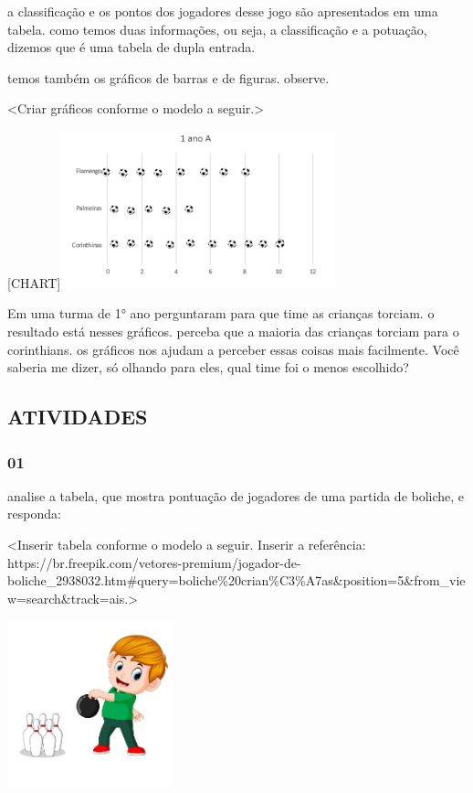 a classificação e os pontos dos jogadores desse jogo são apresentados em
uma tabela. como temos duas informações, ou seja, a classificação e a
potuação, dizemos que é uma tabela de dupla entrada.

temos também os gráficos de barras e de figuras. observe.

\textless{}Criar gráficos conforme o modelo a seguir.\textgreater{}

{{[}CHART{]}}\includegraphics[width=3.13415in,height=1.79094in]{media/image94.png}

Em uma turma de 1° ano perguntaram para que time as crianças torciam. o
resultado está nesses gráficos. perceba que a maioria das crianças
torciam para o corinthians. os gráficos nos ajudam a perceber essas
coisas mais facilmente. Você saberia me dizer, só olhando para eles,
qual time foi o menos escolhido?

\subsection{ATIVIDADES}\label{atividades-6}

\subsubsection{01}\label{section-76}

analise a tabela, que mostra pontuação de jogadores de uma partida de
boliche, e responda:

\textless{}Inserir tabela conforme o modelo a seguir. Inserir a
referência:
https://br.freepik.com/vetores-premium/jogador-de-boliche\_2938032.htm\#query=boliche\%20crian\%C3\%A7as\&position=5\&from\_view=search\&track=ais.\textgreater{}

\includegraphics[width=1.88542in,height=1.88542in]{media/image95.jpg}

